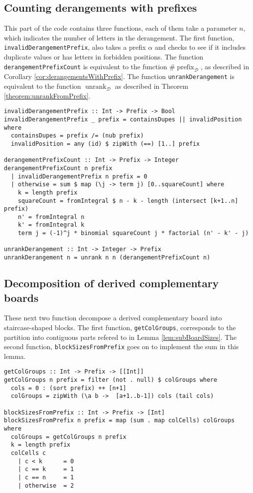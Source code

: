 \subsection{Counting derangements with prefixes}
This part of the code contains three functions, each of them take a parameter
$n$, which indicates the number of letters in the derangement.
The first function, \texttt{invalidDerangementPrefix}, also takes a prefix
$\alpha$ and checks to see if it includes duplicate values or has
letters in forbidden positions.
The function \texttt{derangementPrefixCount}
is equivalent to the function $\#\operatorname{prefix}_\mathcal{D}$,
as described in Corollary \ref{cor:derangementsWithPrefix}.
The function \texttt{unrankDerangement} is equivalent to the function
$\operatorname{unrank}_\mathcal{D}$ as described in
Theorem \ref{theorem:unrankFromPrefix}.
\begin{singlespace}\begin{verbatim}
invalidDerangementPrefix :: Int -> Prefix -> Bool
invalidDerangementPrefix _ prefix = containsDupes || invalidPosition where
  containsDupes = prefix /= (nub prefix)
  invalidPosition = any (id) $ zipWith (==) [1..] prefix

derangementPrefixCount :: Int -> Prefix -> Integer
derangementPrefixCount n prefix
  | invalidDerangementPrefix n prefix = 0
  | otherwise = sum $ map (\j -> term j) [0..squareCount] where
    k = length prefix
    squareCount = fromIntegral $ n - k - length (intersect [k+1..n] prefix)
    n' = fromIntegral n
    k' = fromIntegral k
    term j = (-1)^j * binomial squareCount j * factorial (n' - k' - j)

unrankDerangement :: Int -> Integer -> Prefix
unrankDerangement n = unrank n n (derangementPrefixCount n)
\end{verbatim}\end{singlespace}

\subsection{Decomposition of derived complementary boards}
These next two function decompose a derived complementary board into
staircase-shaped blocks.
The first function, \texttt{getColGroups}, corresponds to the partition
into contiguous parts refered to in Lemma \ref{lem:subBoardSizes}.
The second function, \texttt{blockSizesFromPrefix} goes on to implement the
sum in this lemma.
\begin{singlespace}\begin{verbatim}
getColGroups :: Int -> Prefix -> [[Int]]
getColGroups n prefix = filter (not . null) $ colGroups where
  cols = 0 : (sort prefix) ++ [n+1]
  colGroups = zipWith (\a b ->  [a+1..b-1]) cols (tail cols)

blockSizesFromPrefix :: Int -> Prefix -> [Int]
blockSizesFromPrefix n prefix = map (sum . map colCells) colGroups where
  colGroups = getColGroups n prefix
  k = length prefix
  colCells c
    | c < k      = 0
    | c == k     = 1
    | c == n     = 1
    | otherwise  = 2
\end{verbatim}\end{singlespace}

